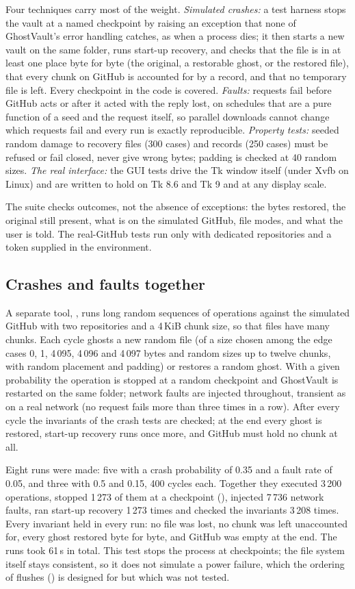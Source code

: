 Four techniques carry most of the weight.
\emph{Simulated crashes:} a test harness stops the vault at a named checkpoint by raising an exception
that none of GhostVault's error handling catches, as when a process dies; it then starts a new vault on
the same folder, runs start-up recovery, and checks that the file is in at least one place byte for
byte (the original, a restorable ghost, or the restored file), that every chunk on GitHub is accounted
for by a record, and that no temporary file is left. Every checkpoint in the code is covered.
\emph{Faults:} requests fail before GitHub acts or after it acted with the reply lost, on schedules that
are a pure function of a seed and the request itself, so parallel downloads cannot change which
requests fail and every run is exactly reproducible.
\emph{Property tests:} seeded random damage to recovery files (300 cases) and records (250 cases)
must be refused or fail closed, never give wrong bytes; padding is checked at 40 random sizes.
\emph{The real interface:} the GUI tests drive the Tk window itself (under Xvfb on Linux) and are
written to hold on Tk 8.6 and Tk 9 and at any display scale.

The suite checks outcomes, not the absence of exceptions: the bytes restored, the original still
present, what is on the simulated GitHub, file modes, and what the user is told. The real-GitHub tests
run only with dedicated repositories and a token supplied in the environment.

\subsection{Crashes and faults together}\label{sec:stress}
A separate tool, , runs long random sequences of operations against the
simulated GitHub with two repositories and a 4\,KiB chunk size, so that files have many chunks. Each
cycle ghosts a new random file (of a size chosen among the edge cases 0, 1, 4\,095, 4\,096 and
4\,097 bytes and random sizes up to twelve chunks, with random placement and padding) or restores a
random ghost. With a given probability the operation is stopped at a random checkpoint and GhostVault
is restarted on the same folder; network faults are injected throughout, transient as on a real
network (no request fails more than three times in a row). After every cycle the invariants of the
crash tests are checked; at the end every ghost is restored, start-up recovery runs once more, and
GitHub must hold no chunk at all.

Eight runs were made: five with a crash probability of 0.35 and a fault rate of 0.05, and three with
0.5 and 0.15, 400 cycles each. Together they executed 3\,200 operations, stopped 1\,273 of them at a
checkpoint (), injected 7\,736 network faults, ran start-up recovery 1\,273 times
and checked the invariants 3\,208 times. Every invariant held in every run: no file was lost, no chunk
was left unaccounted for, every ghost restored byte for byte, and GitHub was empty at the end. The runs
took 61\,s in total. This test stops the process at checkpoints; the file system itself stays
consistent, so it does not simulate a power failure, which the ordering of flushes
() is designed for but which was not tested.

